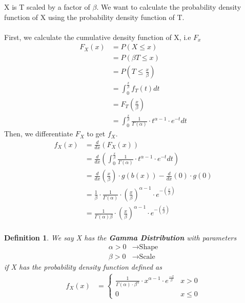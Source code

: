 \documentclass[11pt,oneside]{book}
\theoremstyle{break}
\theoremstyle{break}
\newtheorem{defn}{Definition}[corL]
\begin{document}
X is T scaled by a factor of $\beta$. We want to calculate the probability density function of X using the probability density function of T.\\
\hfill\\
First, we calculate the cumulative density function of X, i.e $F_x$\begin{align*}
F_X(x)&=P(X\leq x)\\
&=P(\beta T\leq x)\\
&=P(T\leq \frac{x}{\beta})\\
&=\int_{0}^{\frac{x}{\beta}}f_{T}(t)dt\\
&=F_T\left(\frac{x}{\beta} \right)\\
&=\int_{0}^{\frac{x}{\beta}}\frac{1}{\Gamma(\alpha)}\cdot t^{\alpha -1}\cdot e^{-t}dt
\end{align*}
Then, we differentiate $F_X$ to get $f_X$.\begin{align*}
f_X(x)&=\frac{d}{dx}(F_X(x))\\
&=\frac{d}{dx}\left( \int_{0}^{\frac{x}{\beta}}\frac{1}{\Gamma(\alpha)}\cdot t^{\alpha -1}\cdot e^{-t}dt\right)\\
&=\frac{d}{dx}\left( \frac{x}{\beta}\right)\cdot g(b(x))-\frac{d}{dx}(0)\cdot g(0)\\
&=\frac{1}{\beta}\cdot \frac{1}{\Gamma(\alpha)}\cdot \left( \frac{x}{\beta}\right)^{\alpha-1}\cdot e^{-\left( \frac{x}{\beta}\right)}\\
&=\frac{1}{\Gamma(\alpha)\beta}\cdot \left( \frac{x}{\beta}\right)^{\alpha-1}\cdot e^{-\left( \frac{x}{\beta}\right)}\\
\end{align*} 
\color{black}
\begin{defn}
We say X has the \textbf{Gamma Distribution} with parameters\begin{align*}
\alpha>0 &\rightarrow \text{Shape}\\
\beta>0 &\rightarrow \text{Scale}
\end{align*}
if X has the probability density function defined as \begin{align*}
f_X(x)&=\begin{cases}
\frac{1}{\Gamma(\alpha)\cdot \beta^{\alpha}}\cdot x^{\alpha-1}\cdot e^{\frac{-x}{\beta}}&x>0\\
0&x\leq 0
\end{cases}
\end{align*}
\end{defn}
\end{document}
